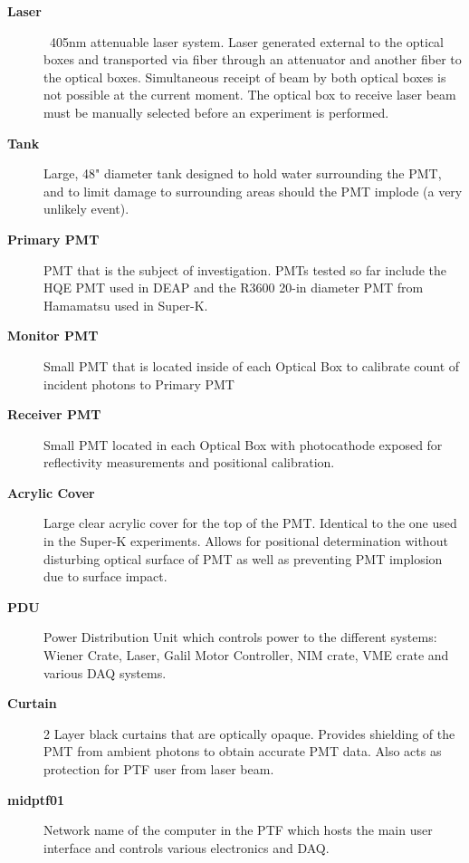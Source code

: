 \documentclass[twoside,letterpaper]{refart}
\begin{document}
\begin{description}
	\item[\textbf{Laser}] ~405nm attenuable laser system.  Laser generated external to the optical boxes and transported via fiber through an attenuator and another fiber to the optical boxes.  Simultaneous receipt of beam by both optical boxes is not possible at the current moment.  The optical box to receive laser beam must be manually selected before an experiment is performed.
	\item[\textbf{Tank}] Large, 48" diameter tank designed to hold water surrounding the PMT, and to limit damage to surrounding areas should the PMT implode (a very unlikely event).
	\item[\textbf{Primary PMT}] PMT that is the subject of investigation.  PMTs tested so far include the HQE PMT used in DEAP and the R3600 20-in diameter PMT from Hamamatsu used in Super-K.
	\item[\textbf{Monitor PMT}] Small PMT that is located inside of each Optical Box to calibrate count of incident photons to Primary PMT
	\item[\textbf{Receiver PMT}] Small PMT located in each Optical Box with photocathode exposed for reflectivity measurements and positional calibration.  
	\item[\textbf{Acrylic Cover}] Large clear acrylic cover for the top of the PMT.  Identical to the one used in the Super-K experiments.  Allows for positional determination without disturbing optical surface of PMT as well as preventing PMT implosion due to surface impact.
	\item[\textbf{PDU}] Power Distribution Unit which controls power to the different systems:  Wiener Crate, Laser, Galil Motor Controller, NIM crate, VME crate and various DAQ systems.
	\item[\textbf{Curtain}] 2 Layer black curtains that are optically opaque.  Provides shielding of the PMT from ambient photons to obtain accurate PMT data.  Also acts as protection for PTF user from laser beam. 
	\item[\textbf{midptf01}] Network name of the computer in the PTF which hosts the main user interface and controls various electronics and DAQ. 
	
	
\end{description}
\end{document}
